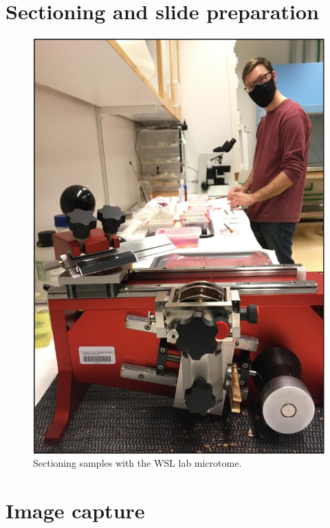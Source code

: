 \documentclass[
]{book}
\begin{document}
\hypertarget{sectioning-and-slide-preparation}{%
\section*{Sectioning and slide preparation}\label{sectioning-and-slide-preparation}}

\begin{figure}

{\centering \includegraphics[width=8.96in,height=0.4\textheight]{images/Methods/sectioning/sam} 

}

\caption{Sectioning samples with the WSL lab microtome.}\label{fig:unnamed-chunk-3}
\end{figure}

\hypertarget{image-capture}{%
\section*{Image capture}\label{image-capture}}
\end{document}
